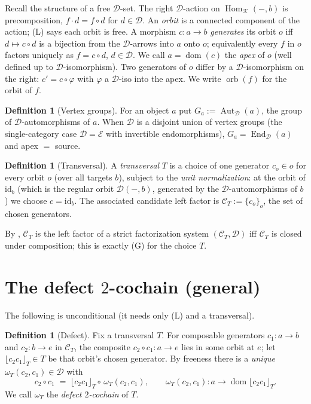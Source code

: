 \documentclass[11pt]{article}
\theoremstyle{definition}
\newtheorem{definition}[theorem]{Definition}
\newcommand{\Hom}{\operatorname{Hom}}
\newcommand{\End}{\operatorname{End}}
\newcommand{\Aut}{\operatorname{Aut}}
\newcommand{\id}{\mathrm{id}}
\newcommand{\C}{\mathcal{C}}
\newcommand{\D}{\mathcal{D}}
\newcommand{\K}{\mathcal{K}}
\newcommand{\E}{\mathcal{E}}
\newcommand{\dom}{\operatorname{dom}}
\newcommand{\orb}{\operatorname{orb}}
\newcommand{\flr}[1]{\lfloor #1 \rfloor}
\newcommand{\1}{\mathbf{1}}
\begin{document}
Recall the structure of a free $\D$-set. The right $\D$-action on $\Hom_\K(-,b)$ is
precomposition, $f\cdot d=f\circ d$ for $d\in\D$. An \emph{orbit} is a connected
component of the action; \textnormal{(L)} says each orbit is free. A morphism
$c\colon a\to b$ \emph{generates} its orbit $o$ iff $d\mapsto c\circ d$ is a
bijection from the $\D$-arrows into $a$ onto $o$; equivalently every $f$ in $o$
factors uniquely as $f=c\circ d$, $d\in\D$. We call $a=\dom(c)$ the \emph{apex} of
$o$ (well defined up to $\D$-isomorphism). Two generators of $o$ differ by a
$\D$-isomorphism on the right: $c'=c\circ\varphi$ with $\varphi$ a $\D$-iso into
the apex. We write $\orb(f)$ for the orbit of $f$.

\begin{definition}[Vertex groups]
For an object $a$ put $G_a:=\Aut_\D(a)$, the group of $\D$-automorphisms of $a$.
When $\D$ is a disjoint union of vertex groups (the single-category case
$\D=\E$ with invertible endomorphisms), $G_a=\End_\D(a)$ and apex $=$ source.
\end{definition}

\begin{definition}[Transversal]
A \emph{transversal} $T$ is a choice of one generator $c_o\in o$ for every orbit
$o$ (over all targets $b$), subject to the \emph{unit normalization}: at the orbit
of $\id_b$ (which is the regular orbit $\D(-,b)$, generated by the $\D$-automorphisms
of $b$) we choose $c=\id_b$. The associated candidate left factor is
$\C_T:=\{c_o\}_o$, the set of chosen generators.
\end{definition}

By \cite[Thm.~1]{pairwise}, $\C_T$ is the left factor of a strict factorization
system $(\C_T,\D)$ iff $\C_T$ is closed under composition; this is exactly
\textnormal{(G)} for the choice $T$.

\section{The defect $2$-cochain (general)}

The following is unconditional (it needs only \textnormal{(L)} and a transversal).

\begin{definition}[Defect]\label{def:defect}
Fix a transversal $T$. For composable generators $c_1\colon a\to b$ and
$c_2\colon b\to e$ in $\C_T$, the composite $c_2\circ c_1\colon a\to e$ lies in some
orbit at $e$; let $\flr{c_2c_1}_T\in T$ be that orbit's chosen generator. By
freeness there is a \emph{unique} $\omega_T(c_2,c_1)\in\D$ with
\begin{equation}\label{eq:defect}
   c_2\circ c_1 \;=\; \flr{c_2 c_1}_T \circ\, \omega_T(c_2,c_1),
   \qquad \omega_T(c_2,c_1)\colon a\to \dom\flr{c_2c_1}_T .
\end{equation}
We call $\omega_T$ the \emph{defect $2$-cochain} of $T$.
\end{definition}
\end{document}
